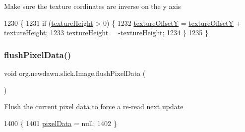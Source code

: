 Make sure the texture cordinates are inverse on the y axis 
\begin{DoxyCode}
1230                                  \{
1231         \textcolor{keywordflow}{if} (\mbox{\hyperlink{classorg_1_1newdawn_1_1slick_1_1_image_a048cc714a1282eac215dbe4e722a3146}{textureHeight}} > 0) \{
1232             \mbox{\hyperlink{classorg_1_1newdawn_1_1slick_1_1_image_a5c542a6d5fccbb7d56d74129b05cb78d}{textureOffsetY}} = \mbox{\hyperlink{classorg_1_1newdawn_1_1slick_1_1_image_a5c542a6d5fccbb7d56d74129b05cb78d}{textureOffsetY}} + 
      \mbox{\hyperlink{classorg_1_1newdawn_1_1slick_1_1_image_a048cc714a1282eac215dbe4e722a3146}{textureHeight}};
1233             \mbox{\hyperlink{classorg_1_1newdawn_1_1slick_1_1_image_a048cc714a1282eac215dbe4e722a3146}{textureHeight}} = -\mbox{\hyperlink{classorg_1_1newdawn_1_1slick_1_1_image_a048cc714a1282eac215dbe4e722a3146}{textureHeight}};
1234         \}
1235     \}
\end{DoxyCode}
\mbox{\label{classorg_1_1newdawn_1_1slick_1_1_image_ae8ba5dcbbaef48c9ee618f8c68aa1b12}} 
\subsubsection{\texorpdfstring{flush\+Pixel\+Data()}{flushPixelData()}}
{\footnotesize\ttfamily void org.\+newdawn.\+slick.\+Image.\+flush\+Pixel\+Data (\begin{DoxyParamCaption}{ }\end{DoxyParamCaption})\hspace{0.3cm}{\ttfamily [inline]}}

Flush the current pixel data to force a re-\/read next update 
\begin{DoxyCode}
1400                                  \{
1401         \mbox{\hyperlink{classorg_1_1newdawn_1_1slick_1_1_image_a9b5f82ff1c234a40d6c23ba2c82165f3}{pixelData}} = null;
1402     \}
\end{DoxyCode}
\mbox{\label{classorg_1_1newdawn_1_1slick_1_1_image_a7541ed08232450c948cfc1956d041069}} 

